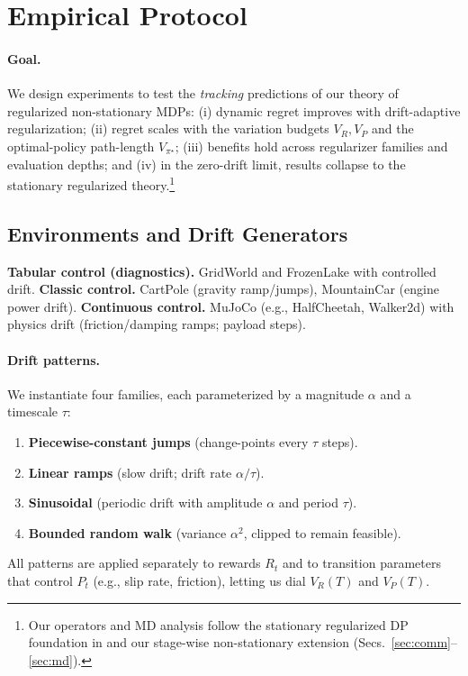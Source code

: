 \documentclass{article}
\theoremstyle{plain}
\theoremstyle{definition}
\theoremstyle{remark}
\newcommand{\1}{\mathbbm{1}}
\begin{document}
\section{Empirical Protocol}
\label{sec:empirical}

\paragraph{Goal.}
We design experiments to test the \emph{tracking} predictions of our theory of regularized non-stationary MDPs: (i) dynamic regret improves with drift-adaptive regularization; (ii) regret scales with the variation budgets $V_R,V_P$ and the optimal-policy path-length $V_{\pi^\star}$; (iii) benefits hold across regularizer families and evaluation depths; and (iv) in the zero-drift limit, results collapse to the stationary regularized theory.\footnote{Our operators and MD analysis follow the stationary regularized DP foundation in \citet{geist2019theory} and our stage-wise non-stationary extension (Secs.~\ref{sec:comm}--\ref{sec:md}).}

\subsection{Environments and Drift Generators}
\label{subsec:envs}
\textbf{Tabular control (diagnostics).} GridWorld and FrozenLake with controlled drift.
\textbf{Classic control.} CartPole (gravity ramp/jumps), MountainCar (engine power drift).
\textbf{Continuous control.} MuJoCo (e.g., HalfCheetah, Walker2d) with physics drift (friction/damping ramps; payload steps).

\paragraph{Drift patterns.}
We instantiate four families, each parameterized by a magnitude $\alpha$ and a timescale $\tau$:
\begin{enumerate}[leftmargin=*,nosep]
\item \textbf{Piecewise-constant jumps} (change-points every $\tau$ steps).
\item \textbf{Linear ramps} (slow drift; drift rate $\alpha/\tau$).
\item \textbf{Sinusoidal} (periodic drift with amplitude $\alpha$ and period $\tau$).
\item \textbf{Bounded random walk} (variance $\alpha^2$, clipped to remain feasible).
\end{enumerate}
All patterns are applied separately to rewards $R_t$ and to transition parameters that control $P_t$ (e.g., slip rate, friction), letting us dial $V_R(T)$ and $V_P(T)$.
\end{document}
